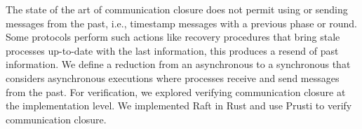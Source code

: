 The state of the art of communication closure does not permit using or sending messages from the past, i.e., timestamp messages with a previous phase or round. Some protocols perform such actions like recovery procedures that bring stale processes up-to-date with the last information, this produces a resend of past information. We define a reduction from an asynchronous to a synchronous that considers asynchronous executions where processes receive and send messages from the past. For verification, we explored verifying communication closure at the implementation level. We implemented Raft in Rust and use Prusti to verify communication closure.
